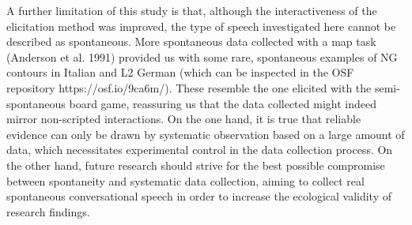 \begin{styleStandard}
A further limitation of this study is that, although the interactiveness of the elicitation method was improved, the type of speech investigated here cannot be described as spontaneous. More spontaneous data collected with a map task (Anderson et al. 1991) provided us with some rare, spontaneous examples of NG contours in Italian and L2 German (which can be inspected in the OSF repository https://osf.io/9ca6m/). These resemble the one elicited with the semi-spontaneous board game, reassuring us that the data collected might indeed mirror non-scripted interactions. On the one hand, it is true that reliable evidence can only be drawn by systematic observation based on a large amount of data, which necessitates experimental control in the data collection process. On the other hand, future research should strive for the best possible compromise between spontaneity and systematic data collection, aiming to collect real spontaneous conversational speech in order to increase the ecological validity of research findings.
\end{styleStandard}

